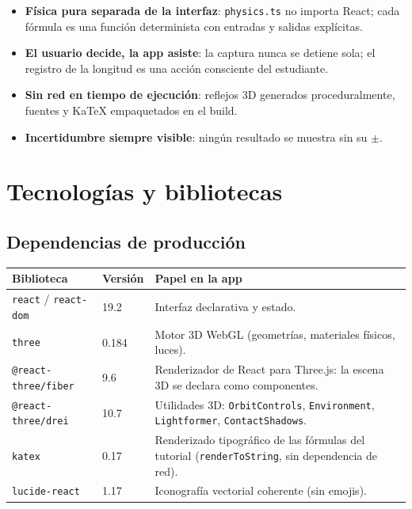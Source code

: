 \documentclass[11pt,a4paper]{article}
\begin{document}
\begin{itemize}[nosep]
  \item \textbf{Física pura separada de la interfaz}: \texttt{physics.ts} no importa React;
        cada fórmula es una función determinista con entradas y salidas explícitas.
  \item \textbf{El usuario decide, la app asiste}: la captura nunca se detiene sola; el
        registro de la longitud es una acción consciente del estudiante.
  \item \textbf{Sin red en tiempo de ejecución}: reflejos 3D generados proceduralmente,
        fuentes y KaTeX empaquetados en el build.
  \item \textbf{Incertidumbre siempre visible}: ningún resultado se muestra sin su $\pm$.
\end{itemize}

\section{Tecnologías y bibliotecas}

\subsection{Dependencias de producción}

\begin{center}
\begin{tabular}{@{}llp{7.0cm}@{}}
\toprule
Biblioteca & Versión & Papel en la app \\
\midrule
\texttt{react} / \texttt{react-dom} & 19.2 & Interfaz declarativa y estado. \\
\texttt{three} & 0.184 & Motor 3D WebGL (geometrías, materiales físicos, luces). \\
\texttt{@react-three/fiber} & 9.6 & Renderizador de React para Three.js: la escena 3D se
declara como componentes. \\
\texttt{@react-three/drei} & 10.7 & Utilidades 3D: \texttt{OrbitControls},
\texttt{Environment}, \texttt{Lightformer}, \texttt{ContactShadows}. \\
\texttt{katex} & 0.17 & Renderizado tipográfico de las fórmulas del tutorial
(\texttt{renderToString}, sin dependencia de red). \\
\texttt{lucide-react} & 1.17 & Iconografía vectorial coherente (sin emojis). \\
\bottomrule
\end{tabular}
\end{center}
\end{document}
